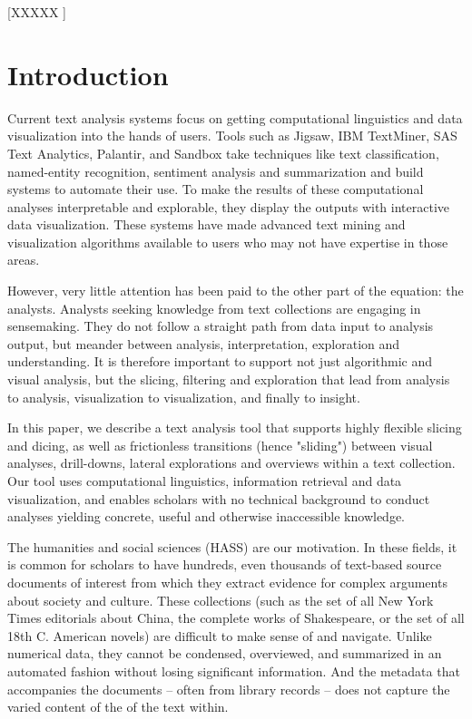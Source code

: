 \documentclass{sig-alternate}
\begin{document}
[XXXXX ]



\section{Introduction}
Current text analysis systems focus on getting computational linguistics and data visualization into the hands of users. Tools such as Jigsaw, IBM TextMiner, SAS Text Analytics, Palantir, and Sandbox take techniques like text classification, named-entity recognition, sentiment analysis and summarization and build systems to automate their use. To make the results of these computational analyses interpretable and explorable, they display the outputs with interactive data visualization. These systems have made advanced text mining and visualization algorithms available to users who may not have expertise in those areas.

However, very little attention has been paid to the other part of the equation: the analysts. Analysts seeking knowledge from text collections are engaging in sensemaking. They do not follow a straight path from data input to analysis output, but meander between analysis, interpretation, exploration and understanding. It is therefore important to support not just algorithmic and visual analysis, but the slicing, filtering and exploration that lead from analysis to analysis, visualization to visualization, and finally to insight.

In this paper, we describe a text analysis tool that supports highly flexible slicing and dicing, as well as frictionless transitions (hence "sliding") between visual analyses, drill-downs, lateral explorations and overviews within a text collection. Our tool uses computational linguistics, information retrieval and data visualization, and enables scholars with no technical background to conduct analyses yielding concrete, useful and otherwise inaccessible knowledge.

The humanities and social sciences (HASS) are our motivation. In these fields, it is common for scholars to have hundreds, even thousands of text-based source documents of interest from which they extract evidence for complex arguments about society and culture. These collections (such as the set of all New York Times editorials about China, the complete works of Shakespeare, or the set of all 18th C. American novels)  are difficult to make sense of and navigate. Unlike numerical data, they cannot be condensed, overviewed, and summarized in an automated fashion without losing significant information. And the metadata that accompanies the documents -- often from library records -- does not capture the varied content of the of the text within.
\end{document}
